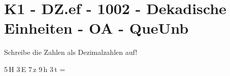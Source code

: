 \section{K1 - DZ.ef - 1002 - Dekadische Einheiten - OA - QueUnb}

\begin{beispiel}{0} %
				Schreibe die Zahlen als Dezimalzahlen auf!\leer
					
					5\,H 3\,E 7\,z 9\,h 3\,t = 
\end{beispiel}
